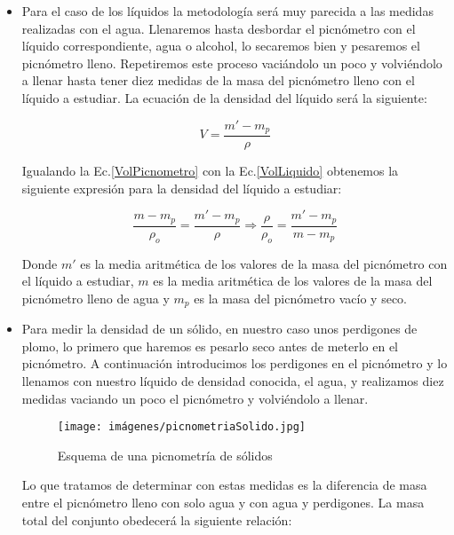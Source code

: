 \documentclass[a4paper,12pt,titlepage]{article}
\begin{document}
\begin{itemize}
    \item Para el caso de los líquidos la metodología será muy parecida a las medidas realizadas con el agua. Llenaremos hasta desbordar el picnómetro con el líquido correspondiente, agua o alcohol, lo secaremos bien y pesaremos el picnómetro lleno. Repetiremos este proceso vaciándolo un poco y volviéndolo a llenar hasta tener diez medidas de la masa del picnómetro lleno con el líquido a estudiar. La ecuación de la densidad del líquido será la siguiente:
    
        \begin{equation}
            V=\frac{m'-m_{p}}{\rho}
            \label{VolLiquido}
        \end{equation}

    Igualando la Ec.\ref{VolPicnometro} con la Ec.\ref{VolLiquido} obtenemos la siguiente expresión para la densidad del líquido a estudiar:

        \begin{equation}
            \frac{m-m_{p}}{\rho_{o}}=\frac{m'-m_{p}}{\rho} \Rightarrow \frac{\rho}{\rho_{o}}=\frac{m'-m_{p}}{m-m_{p}}
            \label{Densidad liq}
        \end{equation}

    \newpage
        Donde $m'$ es la media aritmética de los valores de la masa del picnómetro con el líquido a estudiar, $m$ es la media aritmética de los valores de la masa del picnómetro lleno de agua y $m_{p}$ es la masa del picnómetro vacío y seco.

    \item Para medir la densidad de un sólido, en nuestro caso unos perdigones de plomo, lo primero que haremos es pesarlo seco antes de meterlo en el picnómetro. A continuación introducimos los perdigones en el picnómetro y lo llenamos con nuestro líquido de densidad conocida, el agua, y realizamos diez medidas vaciando un poco el picnómetro y volviéndolo a llenar.
    
    \begin{figure}[h!]
        \centering
        \texttt{[image: imágenes/picnometriaSolido.jpg]}
    
        \caption{Esquema de una picnometría de sólidos}
    \end{figure}

    Lo que tratamos de determinar con  estas medidas es la diferencia de masa entre el picnómetro lleno con solo agua y con agua y perdigones. La masa total del conjunto obedecerá la siguiente relación:
    

\end{itemize}
\end{document}
